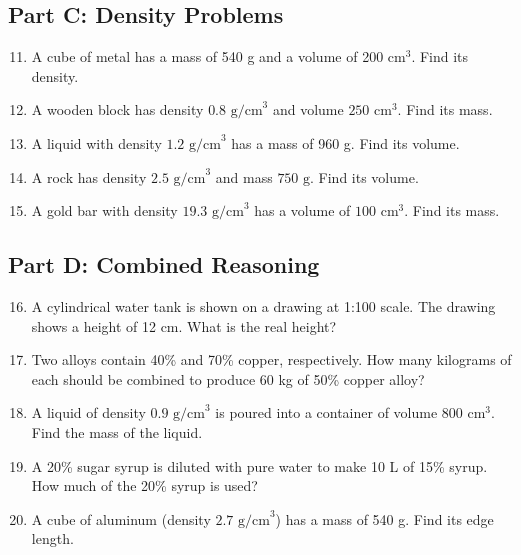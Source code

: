 \documentclass[14pt]{extarticle}
\begin{document}
\subsection*{Part C: Density Problems}
\begin{enumerate}
  \setcounter{enumi}{10}
  \item A cube of metal has a mass of 540 g and a volume of 200 cm\(^3\). Find its density.
  \item A wooden block has density \(0.8\text{ g/cm}^3\) and volume \(250\text{ cm}^3\). Find its mass.
  \item A liquid with density \(1.2\text{ g/cm}^3\) has a mass of 960 g. Find its volume.
  \item A rock has density \(2.5\text{ g/cm}^3\) and mass \(750\text{ g}\). Find its volume.
  \item A gold bar with density \(19.3\text{ g/cm}^3\) has a volume of \(100\text{ cm}^3\). Find its mass.
\end{enumerate}

\subsection*{Part D: Combined Reasoning}
\begin{enumerate}
  \setcounter{enumi}{15}
  \item A cylindrical water tank is shown on a drawing at 1:100 scale. The drawing shows a height of 12 cm. What is the real height?
  \item Two alloys contain 40\% and 70\% copper, respectively. How many kilograms of each should be combined to produce 60 kg of 50\% copper alloy?
  \item A liquid of density \(0.9\text{ g/cm}^3\) is poured into a container of volume 800 cm\(^3\). Find the mass of the liquid.
  \item A 20\% sugar syrup is diluted with pure water to make 10 L of 15\% syrup. How much of the 20\% syrup is used?
  \item A cube of aluminum (density \(2.7\text{ g/cm}^3\)) has a mass of 540 g. Find its edge length.
\end{enumerate}
\end{document}
